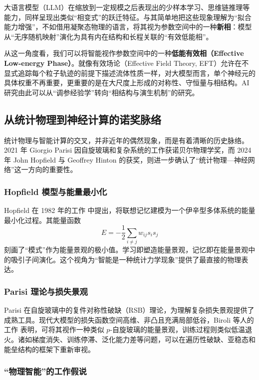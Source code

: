 \documentclass[12pt,a4paper]{article}
\begin{document}
大语言模型（LLM）在缩放到一定规模之后表现出的少样本学习、思维链推理等能力，同样呈现出类似“相变式”的跃迁特征。与其简单地把这些现象理解为“拟合能力增强”，不如借用凝聚态物理的语言，将其视为参数空间中的一种\textbf{新相}：模型从“无序随机映射”演化为具有内在结构和长程关联的“有效低能相”。

从这一角度看，我们可以将智能视作参数空间中的一种\textbf{低能有效相（Effective Low-energy Phase）}。就像有效场论（Effective Field Theory, EFT）允许在不显式追踪每个粒子轨迹的前提下描述流体性质一样，对大模型而言，单个神经元的具体权重不再重要，更重要的是在大尺度上形成的对称性、守恒量与相结构。AI 研究由此可以从“调参经验学”转向“相结构与演生机制”的研究。

\subsection{从统计物理到神经计算的诺奖脉络}

统计物理与智能计算的交叉，并非近年的偶然现象，而是有着清晰的历史脉络。2021 年 Giorgio Parisi 因自旋玻璃和复杂系统的工作获诺贝尔物理学奖\cite{parisi1980order}，而 2024 年 John Hopfield 与 Geoffrey Hinton 的获奖，则进一步确认了“统计物理—神经网络”这一方向的重要性。

\subsubsection{Hopfield 模型与能量最小化}

Hopfield 在 1982 年的工作\cite{hopfield1982neural} 中提出，将联想记忆建模为一个伊辛型多体系统的能量最小化过程。其能量函数
\begin{equation}
    E = -\frac{1}{2}\sum_{i \neq j} w_{ij} s_i s_j
\end{equation}
刻画了“模式”作为能量景观的极小值。学习即塑造能量景观，记忆即在能量景观中的吸引子间演化。这个视角为“智能是一种统计力学现象”提供了最直接的物理表达。

\subsubsection{Parisi 理论与损失景观}

Parisi 在自旋玻璃中的复件对称性破缺（RSB）理论，为理解复杂损失景观提供了成熟工具。现代大模型的损失函数空间高维、非凸且充满局部低谷，Biroli 等人的工作\cite{biroli2024energy} 表明，可将其视作一种类似 $p$-自旋玻璃的能量景观，训练过程则类似低温退火。诸如梯度消失、训练停滞、泛化能力差等问题，可以在遍历性破缺、亚稳态和能垒结构的框架下重新审视。

\subsubsection{“物理智能”的工作假说}
\end{document}

